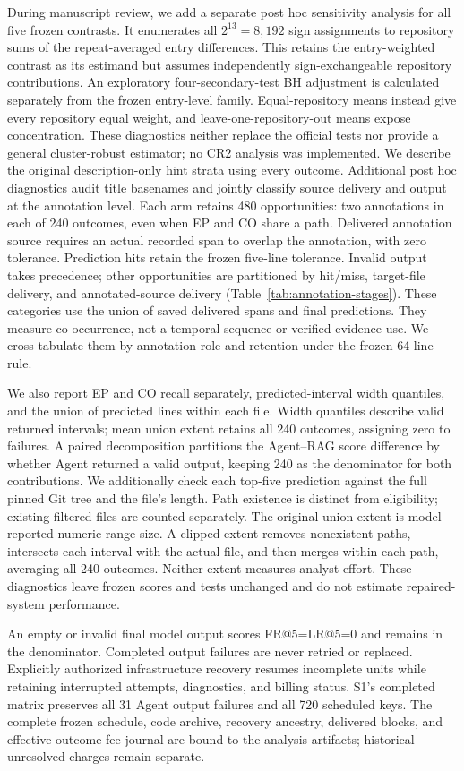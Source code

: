 During manuscript review, we add a separate post hoc sensitivity analysis for all five frozen contrasts. It enumerates all $2^{13}=8{,}192$ sign assignments to repository sums of the repeat-averaged entry differences. This retains the entry-weighted contrast as its estimand but assumes independently sign-exchangeable repository contributions. An exploratory four-secondary-test BH adjustment is calculated separately from the frozen entry-level family. Equal-repository means instead give every repository equal weight, and leave-one-repository-out means expose concentration. These diagnostics neither replace the official tests nor provide a general cluster-robust estimator; no CR2 analysis was implemented. We describe the original description-only hint strata using every outcome. Additional post hoc diagnostics audit title basenames and jointly classify source delivery and output at the annotation level. Each arm retains 480 opportunities: two annotations in each of 240 outcomes, even when EP and CO share a path. Delivered annotation source requires an actual recorded span to overlap the annotation, with zero tolerance. Prediction hits retain the frozen five-line tolerance. Invalid output takes precedence; other opportunities are partitioned by hit/miss, target-file delivery, and annotated-source delivery (Table~\ref{tab:annotation-stages}). These categories use the union of saved delivered spans and final predictions. They measure co-occurrence, not a temporal sequence or verified evidence use. We cross-tabulate them by annotation role and retention under the frozen 64-line rule.

We also report EP and CO recall separately, predicted-interval width quantiles, and the union of predicted lines within each file. Width quantiles describe valid returned intervals; mean union extent retains all 240 outcomes, assigning zero to failures. A paired decomposition partitions the Agent--RAG score difference by whether Agent returned a valid output, keeping 240 as the denominator for both contributions. We additionally check each top-five prediction against the full pinned Git tree and the file's length. Path existence is distinct from eligibility; existing filtered files are counted separately. The original union extent is model-reported numeric range size. A clipped extent removes nonexistent paths, intersects each interval with the actual file, and then merges within each path, averaging all 240 outcomes. Neither extent measures analyst effort. These diagnostics leave frozen scores and tests unchanged and do not estimate repaired-system performance.

An empty or invalid final model output scores FR@5=LR@5=0 and remains in the denominator. Completed output failures are never retried or replaced. Explicitly authorized infrastructure recovery resumes incomplete units while retaining interrupted attempts, diagnostics, and billing status. S1's completed matrix preserves all 31 Agent output failures and all 720 scheduled keys. The complete frozen schedule, code archive, recovery ancestry, delivered blocks, and effective-outcome fee journal are bound to the analysis artifacts; historical unresolved charges remain separate.
